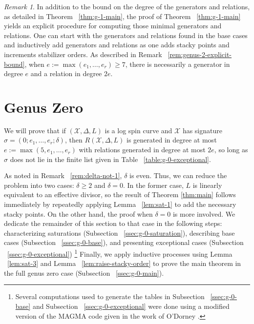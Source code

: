 \documentclass{amsart}
\theoremstyle{plain}
\theoremstyle{definition}
\theoremstyle{remark}
\newtheorem{rem}[thm]{Remark}
\numberwithin{equation}{section}
\newcommand\sx{\mathscr X}
\newcommand{\halfcan}{L}
\begin{document}
\begin{rem}
\label{rem:genus-1-explicit-bound}
In addition to the bound on the degree of the generators and relations, as detailed in Theorem ~\ref{thm:g-1-main}, the proof of Theorem ~\ref{thm:g-1-main} yields an explicit procedure for computing those minimal generators and relations. One can start with the generators and relations found in the base cases and inductively add generators and relations as one adds stacky points and increments stabilizer orders. As described in Remark ~\ref{rem:genus-2-explicit-bound}, when $e := \max(e_1,\ldots, e_r) \geq 7$, there is necessarily a generator in degree $e$ and a relation in degree $2e$.
\end{rem}


\section{Genus Zero}
\label{sec:g-0}
We will prove that if $(\sx, \Delta, \halfcan)$ is a log spin
curve and $\sx$ has signature $\sigma = (0; e_1, \ldots, e_r;
\delta)$, then $R(\sx, \Delta, L)$ is generated in degree at most
$e := \max(5, e_1, \ldots, e_r)$ with relations generated in degree
at most $2e$, so long as $\sigma$ does not lie in the finite list
given in Table ~\ref{table:g-0-exceptional}.

As noted in Remark ~\ref{rem:delta-not-1}, $\delta$ is even. Thus,
we can reduce the problem into two cases: $\delta \geq 2$ and
$\delta = 0$. In the former case, $\halfcan$ is linearly equivalent
to an effective divisor, so the result of Theorem \ref{thm:main}
follows immediately by repeatedly applying Lemma ~\ref{lem:sat-1}
to add the necessary stacky points. On the other hand, the proof
when $\delta = 0$ is more involved. We dedicate the remainder of
this section to that case in the following steps: characterizing
saturations (Subsection ~\ref{ssec:g-0-saturation}),
describing base cases (Subsection ~\ref{ssec:g-0-base}), and
presenting exceptional cases (Subsection ~\ref{ssec:g-0-exceptional})
\footnote{Several computations used to generate the tables in
Subsection ~\ref{ssec:g-0-base} and Subsection
~\ref{ssec:g-0-exceptional} were done using a modified version of
the MAGMA code given in the work of O'Dorney \cite{dorney:canonical}.}
Finally, we apply inductive processes using Lemma ~\ref{lem:sat-3}
and Lemma ~\ref{lem:raise-stacky-order} to prove the main theorem
in the full genus zero case (Subsection ~\ref{ssec:g-0-main}).
 
\end{document}
